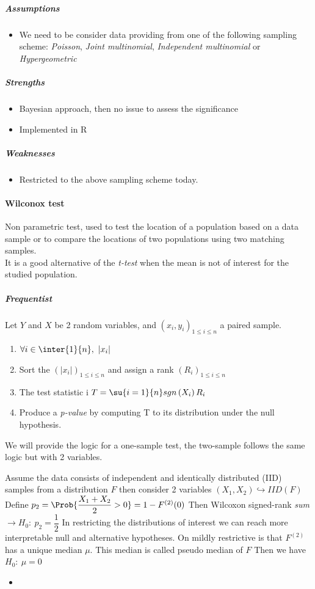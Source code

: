 \subparagraph{Assumptions}
\begin{itemize}
    \item We need to be consider data providing from one of the following sampling scheme: \emph{Poisson}, \emph{Joint multinomial}, \emph{Independent multinomial} or 
        \emph{Hypergeometric}
\end{itemize}

\subparagraph{Strengths}
\begin{itemize}
    \item Bayesian approach, then no issue to assess the significance
    \item Implemented in R
\end{itemize}

\subparagraph{Weaknesses}
\begin{itemize}
    \item Restricted to the above sampling scheme today. 
\end{itemize}


\paragraph{Wilconox test}
Non parametric test, used to test the location of a population based on a data sample or 
to compare the locations of two populations using two matching samples.\\
It is a good alternative of the \emph{t-test} when the mean is not of interest for the 
studied population.
\subparagraph{Frequentist}
Let $Y$ and $X$ be 2 random variables, and $\left(x_{i}, y_{i}\right)_{1\leq i\leq n}$
a paired sample. 
\begin{enumerate}
    \item $\forall i\in\inter{1}{n},~\left|x_{i}\right|$
    \item Sort the $\left(\left|x_{i}\right|\right)_{1\leq i\leq n}$ and assign a rank
        $\left(R_{i}\right)_{1\leq i\leq n}$
    \item The test statistic i $T=\su{i=1}{n}sgn\left(X_{i}\right)R_{i}$
    \item Produce a \emph{p-value} by computing T to its distribution under the null
        hypothesis.
\end{enumerate}
We will provide the logic for a one-sample test, the two-sample follows the same logic but
with 2 variables.

Assume the data consists of independent and identically distributed (IID) samples from a
distribution $F$ then consider 2 variables $(X_{1}, X_{2})\hookrightarrow IID(F)$
Define $p_{2} = \Prob{\dfrac{X_{1} + X_{2}}{2}>0} = 1-F^{(2)}(0)$
Then Wilcoxon signed-rank \emph{sum} $\rightarrow H_{0}:~p_{2} = \dfrac{1}{2}$
In restricting the distributions of interest we can reach more interpretable null and 
alternative hypotheses. On mildly restrictive is that $F^(2)$ has a unique median $\mu$. 
This median is called pseudo median of $F$
Then we have $H_{0}:~\mu=0$
\begin{itemize}
    \item  
\end{itemize}


